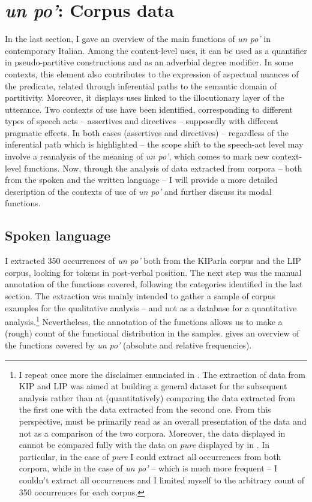 \section{\textit{un po’}: Corpus data}
\largerpage[2]
\hypertarget{Toc124860662}{}
In the last section, I gave an overview of the main functions of \textit{un po’} in contemporary Italian. Among the content-level uses, it can be used as a quantifier in pseudo-partitive constructions and as an adverbial degree modifier. In some contexts, this element also contributes to the expression of aspectual nuances of the predicate, related through inferential paths to the semantic domain of partitivity. Moreover, it displays uses linked to the illocutionary layer of the utterance. Two contexts of use have been identified, corresponding to different types of speech acts – assertives and directives – supposedly with different pragmatic effects. In both cases (assertives and directives) – regardless of the inferential path which is highlighted – the scope shift to the speech-act level may involve a reanalysis of the meaning of \textit{un po’}, which comes to mark new context-level functions. Now, through the analysis of data extracted from corpora – both from the spoken and the written language – I will provide a more detailed description of the contexts of use of \textit{un po’} and further discuss its modal functions.

\subsection{Spoken language}
\largerpage[2]
\hypertarget{Toc124860663}{}
I extracted 350 occurrences of \textit{un po’} both from the KIParla corpus and the LIP corpus, looking for tokens in post-verbal position. The next step was the manual annotation of the functions covered, following the categories identified in the last section. The extraction was mainly intended to gather a sample of corpus examples for the qualitative analysis – and not as a database for a quantitative analysis.\footnote{I repeat once more the disclaimer enunciated in . The extraction of data from KIP and LIP was aimed at building a general dataset for the subsequent analysis rather than at (quantitatively) comparing the data extracted from the first one with the data extracted from the second one. From this perspective,  must be primarily read as an overall presentation of the data and not as a comparison of the two corpora. Moreover, the data displayed in  cannot be compared fully with the data on \textit{pure} displayed by  in . In particular, in the case of \textit{pure} I could extract all occurrences from both corpora, while in the case of \textit{un po’} – which is much more frequent – I couldn’t extract all occurrences and I limited myself to the arbitrary count of 350 occurrences for each corpus.} Nevertheless, the annotation of the functions allows us to make a (rough) count of the functional distribution in the samples.  gives an overview of the functions covered by \textit{un po’} (absolute and relative frequencies).

